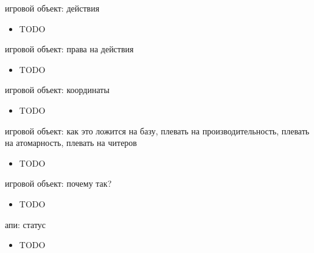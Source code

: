 \documentclass[aspectratio=169,handout,bigger]{beamer}
\begin{document}
\begin{frame}{игровой объект: действия}
  \begin{itemize}
    \item TODO
  \end{itemize}
\end{frame}


\begin{frame}{игровой объект: права на действия}
  \begin{itemize}
    \item TODO
  \end{itemize}
\end{frame}


\begin{frame}{игровой объект: координаты}
  \begin{itemize}
    \item TODO
  \end{itemize}
\end{frame}


\begin{frame}{игровой объект: как это ложится на базу, плевать на производительность, плевать на атомарность, плевать на читеров}
  \begin{itemize}
    \item TODO
  \end{itemize}
\end{frame}


\begin{frame}{игровой объект: почему так?}
  \begin{itemize}
    \item TODO
  \end{itemize}
\end{frame}


\begin{frame}{апи: статус}
  \begin{itemize}
    \item TODO
  \end{itemize}
\end{frame}
\end{document}
